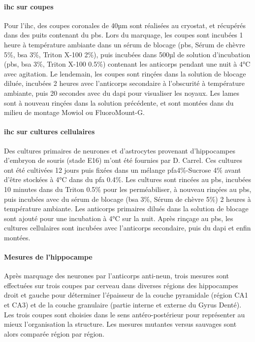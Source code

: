 \paragraph{\Acrlong{ihc} sur coupes}	
\label{par:ihccoupe}
	Pour l'\Gls{ihc}, des coupes coronales de 40µm sont réalisées au cryostat, et récupérés dans des puits contenant du \acrshort{pbs}. Lors du marquage, les coupes sont incubées 1 heure à température ambiante dans un sérum de blocage (\acrshort{pbs}, Sérum de chèvre 5\%, \acrshort{bsa} 3\%, Triton X-100 2\%), puis  incubées dans 500µl de solution d'incubation (\acrshort{pbs}, \acrshort{bsa} 3\%, Triton X-100 0.5\%) contenant les anticorps pendant une nuit à 4°C avec agitation. Le lendemain, les coupes sont rinçées dans la solution de blocage diluée, incubées 2 heures avec l'anticorps secondaire à l'obscurité à température ambiante, puis 20 secondes avec du \gls{dapi} pour visualiser les noyaux. Les lames sont à nouveau rinçées dans la solution précédente, et sont montées dans du milieu de montage Mowiol ou FluoroMount-G\textregistered.
	
\paragraph{\Acrlong{ihc} sur cultures cellulaires}
\label{par:ihcculture}
	Des cultures primaires de neurones et d'astrocytes provenant d'hippocampes d'embryon de  souris (stade E16) m'ont été fournies par D. Carrel. Ces cultures ont été cultivées 12 jours puis fixées dans un mélange \gls{pfa}4\%-Sucrose 4\% avant d'être stockées à 4°C dans du \gls{pfa} 0.4\%. Les cultures sont rincées au \acrshort{pbs}, incubées 10 minutes dans du Triton 0.5\% pour les perméabiliser, à nouveau rinçées au \acrshort{pbs}, puis incubées avec du sérum de blocage (\acrshort{bsa} 3\%, Sérum de chèvre 5\%) 2 heures à température ambiante. Les anticorps primaires dilués dans la solution de blocage sont ajouté pour une incubation à 4°C sur la nuit.  Après rinçage au \acrshort{pbs}, les cultures cellulaires sont incubées avec l'anticorps secondaire, puis du \acrshort{dapi} et enfin montées.
	
\paragraph{Mesures de l'hippocampe}
\label{par:hippNeuN}
	Après marquage des neurones par l'anticorps anti-\acrshort{neun}, trois mesures sont effectuées sur trois coupes par cerveau dans diverses régions des hippocampes droit et gauche pour déterminer l'épaisseur de la couche pyramidale (région CA1 et CA3) et de la couche granulaire (partie interne et externe du Gyrus Denté). Les trois coupes sont choisies dans le sens antéro-postérieur pour représenter au mieux l'organisation la structure. Les mesures mutantes versus sauvages sont alors comparée région par région.
	
